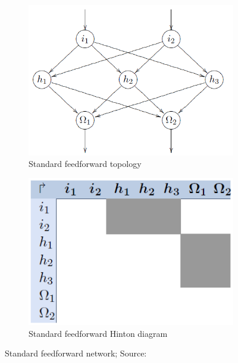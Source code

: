 \documentclass[pdftex,a4paper,12pt,twoside]{report}
\theoremstyle{plain} \newtheorem{theorem}{Theorem} \newtheorem{proposition}{Proposition} \newtheorem{lemma}{Lemma} \newtheorem*{corollary}{Corollary}
\theoremstyle{definition} \newtheorem{definition}{Definition} \newtheorem{conjecture}{Conjecture} \newtheorem*{example}{Example} \newtheorem{algorithm}{Algorithm}
\theoremstyle{remark} \newtheorem*{remark}{Remark} \newtheorem*{note}{Note} \newtheorem{case}{Case}
\begin{document}
\begin{figure}
\centering
	\begin{subfigure}[b]{0.3\textwidth}
	\centering
	\includegraphics[width=\textwidth]{./img/Feedforward-normal-Topology.png}
	\caption{Standard feedforward topology}
	\end{subfigure}
	\begin{subfigure}[b]{0.3\textwidth}
	\centering
	\includegraphics[width=\textwidth]{./img/Feedforward-normal-Hinton.png}
	\caption{Standard feedforward Hinton diagram}
	\end{subfigure}
\caption{Standard feedforward network; Source:\citep{Kriesel2013}}
\label{fig:feedforward}
\end{figure}
\end{document}
